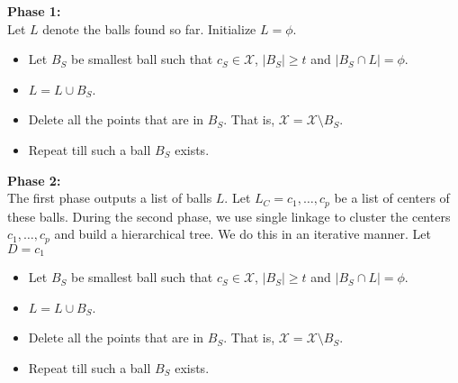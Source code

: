 \documentclass[11pt]{article}
\begin{document}
\noindent \textbf{Phase 1:}\\ Let $L$ denote the balls found so far. Initialize $L = \phi$.
\begin{itemize}
\item Let $B_S$ be smallest ball such that $c_S \in \mathcal{X}$, $|B_S| \ge t$  and $|B_S \cap L | = \phi$.
\item $L = L \cup B_S$.
\item Delete all the points that are in $B_S$. That is, $\mathcal{X} = \mathcal{X}\setminus B_S$.
\item Repeat till such a ball $B_S$ exists.
\end{itemize}

\noindent \textbf{Phase 2:}\\ The first phase outputs a list of balls $L$. Let $L_C = c_1,\ldots,c_p$ be a list of centers of these balls. During the second phase, we use single linkage to cluster the centers $c_1,\ldots,c_p$ and build a hierarchical tree. We do this in an iterative manner. Let $D = c_1$
\begin{itemize}
\item Let $B_S$ be smallest ball such that $c_S \in \mathcal{X}$, $|B_S| \ge t$  and $|B_S \cap L | = \phi$.
\item $L = L \cup B_S$.
\item Delete all the points that are in $B_S$. That is, $\mathcal{X} = \mathcal{X}\setminus B_S$.
\item Repeat till such a ball $B_S$ exists.
\end{itemize}
\end{document}
